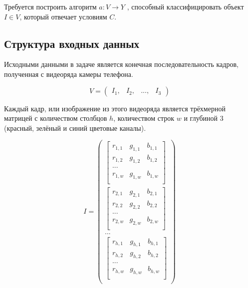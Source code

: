 Требуется построить алгоритм $a : V \rightarrow Y$ , способный классифицировать объект $I \in V$, который отвечает условиям $C$.


\subsection{Структура входных данных}
Исходными данными в задаче является конечная последовательность кадров, полученная с видеоряда  камеры телефона.

\begin{equation}
    V = \begin{pmatrix}
                I_1, & I_2, & ..., & I_3
        \end{pmatrix}
\end{equation}          

Каждый кадр, или изображение из этого видеоряда является трёхмерной матрицей с количеством столбцов  $h$, количеством строк $w$ и глубиной 3 (красный, зелёный и синий цветовые каналы). 

\begin{equation} 
I =    \begin{pmatrix} 
            \begin{bmatrix}
            r_{1,1} & g_{1,1} & b_{1,1}\\
            r_{1,2} & g_{1,2} & b_{1,2}\\
            ...\\
            r_{1,w} & g_{1,w} & b_{1,w}\\
            \end{bmatrix}\\
            \begin{bmatrix}
            r_{2,1} & g_{2,1} & b_{2,1}\\
            r_{2,2} & g_{2,2} & b_{2,2}\\
            ...\\
            r_{2,w} & g_{2,w} & b_{2,w}\\
            \end{bmatrix}\\
            ...\\
            \begin{bmatrix}
            r_{h,1} & g_{h,1} & b_{h,1}\\
            r_{h,2} & g_{h,2} & b_{h,2}\\
            ...\\
            r_{h,w} & g_{h,w} & b_{h,w}\\
            \end{bmatrix}\\ 
        \end{pmatrix}
\end{equation}

